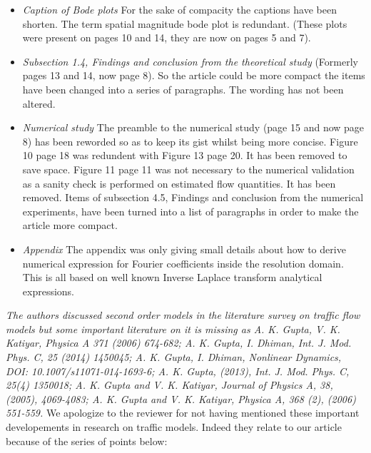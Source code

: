 \documentclass{article}
\begin{document}
\begin{itemize}
\item
\emph{Caption of Bode plots}
For the sake of compacity the captions have been shorten. The term spatial magnitude bode plot is redundant. (These plots were present on pages 10 and 14, they are now on pages 5 and 7).

\item
\emph{Subsection 1.4, Findings and conclusion from the theoretical study}
(Formerly pages 13 and 14, now page 8). So the article could be more compact the items have been changed into a series of paragraphs. The wording has not been altered.

\item
\emph{Numerical study}
The preamble to the numerical study (page 15 and now page 8) has been reworded so as to keep its gist whilst being more concise.
Figure 10 page 18 was redundent with Figure 13 page 20. It has been removed to save space.
Figure 11 page 11 was not necessary to the numerical validation as a sanity check is performed on estimated flow quantities. It has been removed.
Items of subsection 4.5, Findings and conclusion from the numerical experiments, have been turned into a list of paragraphs in order to make the article more compact.

\item
\emph{Appendix}
The appendix was only giving small details about how to derive numerical expression for Fourier coefficients inside the resolution domain. This is all based on well known Inverse Laplace transform analytical expressions.

\end{itemize}

\bigskip{}

\emph{
The authors discussed second order models in the literature survey on traffic flow models but some important literature on it is missing as A. K. Gupta, V. K. Katiyar, Physica A 371 (2006) 674-682;  A. K. Gupta, I. Dhiman, Int. J. Mod. Phys. C, 25 (2014) 1450045; A. K. Gupta, I. Dhiman, Nonlinear Dynamics, DOI: 10.1007/s11071-014-1693-6; A. K. Gupta, (2013), Int. J. Mod. Phys. C, 25(4) 1350018; A. K. Gupta and V. K. Katiyar, Journal of Physics A, 38, (2005), 4069-4083; A. K. Gupta and V. K. Katiyar, Physica A, 368 (2), (2006) 551-559.
}
We apologize to the reviewer for not having mentioned these important developements in research on traffic models. Indeed they relate to our article because of the series of points below:
\end{document}
